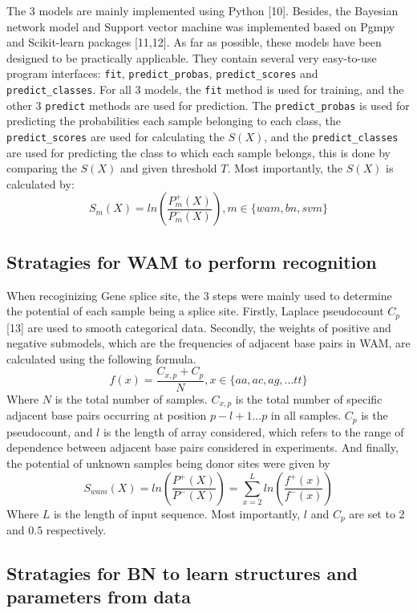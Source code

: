 \documentclass[11pt]{article}
\begin{document}
The 3 models are mainly implemented using Python {[}10{]}. Besides, the
Bayesian network model and Support vector machine was implemented based
on Pgmpy and Scikit-learn packages {[}11,12{]}. As far as possible,
these models have been designed to be practically applicable. They
contain several very easy-to-use program interfaces: \texttt{fit},
\texttt{predict\_probas}, \texttt{predict\_scores} and
\texttt{predict\_classes}. For all 3 models, the \texttt{fit} method is
used for training, and the other 3 \texttt{predict} methods are used for
prediction. The \texttt{predict\_probas} is used for predicting the
probabilities each sample belonging to each class, the
\texttt{predict\_scores} are used for calculating the \(S(X)\), and the
\texttt{predict\_classes} are used for predicting the class to which
each sample belongs, this is done by comparing the \(S(X)\) and given
threshold \(T\). Most importantly, the \(S(X)\) is calculated by:
\[S_m(X) = ln(\frac{P_m^+ (X)}{P_m^- (X)}), m\in\{wam, bn, svm\} \tag{1}\]

    \hypertarget{stratagies-for-wam-to-perform-recognition}{%
\subsection{Stratagies for WAM to perform
recognition}\label{stratagies-for-wam-to-perform-recognition}}

When recoginizing Gene splice site, the 3 steps were mainly used to
determine the potential of each sample being a splice site. Firstly,
Laplace pseudocount \(C_p\) {[}13{]} are used to smooth categorical
data. Secondly, the weights of positive and negative submodels, which
are the frequencies of adjacent base pairs in WAM, are calculated using
the following formula.
\[f(x) = \frac{C_{x,p}+C_p}{N},x \in \{aa,ac,ag,...tt\} \tag{2} \] Where
\(N\) is the total number of samples. \(C_{x,p}\) is the total number of
specific adjacent base pairs occurring at position \(p-l+1...p\) in all
samples. \(C_p\) is the pseudocount, and \(l\) is the length of array
considered, which refers to the range of dependence between adjacent
base pairs considered in experiments. And finally, the potential of
unknown samples being donor sites were given by
\[S_{wam}(X) = ln(\frac{P^+(X)}{P^-(X)}) = \sum_{x=2}^{L}{ln(\frac{f^+(x)}{f^-(x)})} \tag{3}\]
Where \(L\) is the length of input sequence. Most importantly, \(l\) and
\(C_p\) are set to \(2\) and \(0.5\) respectively.

    \hypertarget{stratagies-for-bn-to-learn-structures-and-parameters-from-data}{%
\subsection{Stratagies for BN to learn structures and parameters from
data}\label{stratagies-for-bn-to-learn-structures-and-parameters-from-data}}
\end{document}
